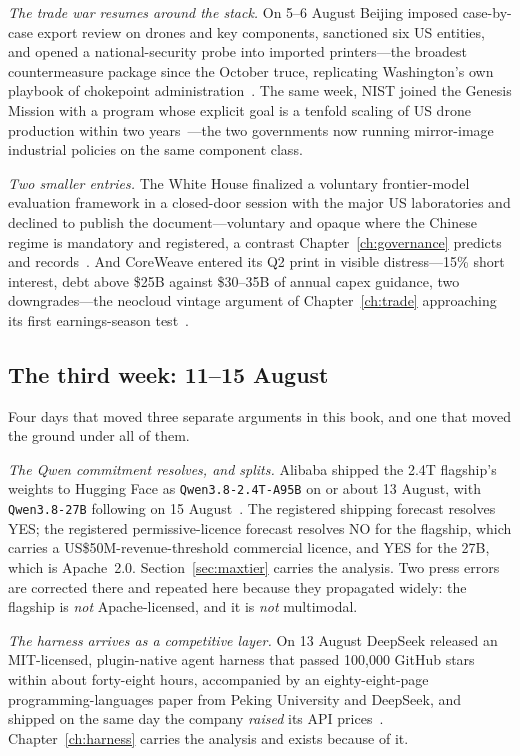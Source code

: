 \emph{The trade war resumes around the stack.} On 5--6 August Beijing imposed case-by-case export review on drones and key components, sanctioned six US entities, and opened a national-security probe into imported printers---the broadest countermeasure package since the October truce, replicating Washington's own playbook of chokepoint administration~\cite{mofcom-retaliation}. The same week, NIST joined the Genesis Mission with a program whose explicit goal is a tenfold scaling of US drone production within two years~\cite{nist-genesis}---the two governments now running mirror-image industrial policies on the same component class.

\emph{Two smaller entries.} The White House finalized a voluntary frontier-model evaluation framework in a closed-door session with the major US laboratories and declined to publish the document---voluntary and opaque where the Chinese regime is mandatory and registered, a contrast Chapter~\ref{ch:governance} predicts and records~\cite{wh-framework}. And CoreWeave entered its Q2 print in visible distress---15\% short interest, debt above \$25B against \$30--35B of annual capex guidance, two downgrades---the neocloud vintage argument of Chapter~\ref{ch:trade} approaching its first earnings-season test~\cite{coreweave-q2}.

\subsection{The third week: 11--15 August}

Four days that moved three separate arguments in this book, and one that moved the ground under all of them.

\emph{The Qwen commitment resolves, and splits.} Alibaba shipped the 2.4T flagship's weights to Hugging Face as \texttt{Qwen3.8-2.4T-A95B} on or about 13 August, with \texttt{Qwen3.8-27B} following on 15 August~\cite{qwen38-weights,qwen38-scmp}. The registered shipping forecast resolves YES; the registered permissive-licence forecast resolves NO for the flagship, which carries a US\$50M-revenue-threshold commercial licence, and YES for the 27B, which is Apache~2.0. Section~\ref{sec:maxtier} carries the analysis. Two press errors are corrected there and repeated here because they propagated widely: the flagship is \emph{not} Apache-licensed, and it is \emph{not} multimodal.

\emph{The harness arrives as a competitive layer.} On 13 August DeepSeek released an MIT-licensed, plugin-native agent harness that passed 100{,}000 GitHub stars within about forty-eight hours, accompanied by an eighty-eight-page programming-languages paper from Peking University and DeepSeek, and shipped on the same day the company \emph{raised} its API prices~\cite{dsh-repo,cordis-paper,dsh-venturebeat}. Chapter~\ref{ch:harness} carries the analysis and exists because of it.

